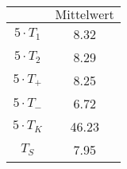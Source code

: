 \begin{minipage}{0.49\textwidth}
 \centering
 \begin{tabular}{S S}
 \toprule
 $\text{}$ & $\text{Mittelwert}$ \\
 \midrule
${5} \cdot T_{1}$  &  8.32  \\
${5} \cdot T_{2}$  &  8.29  \\
${5} \cdot T_{+}$  &  8.25   \\
${5} \cdot T_{-}$  & 6.72  \\
${5} \cdot T_{K}$  &  46.23  \\
$T_{S}$ & 7.95 \\

 \bottomrule
 \end{tabular}
 \label{tab:mids_T_70}
  \end{minipage}
